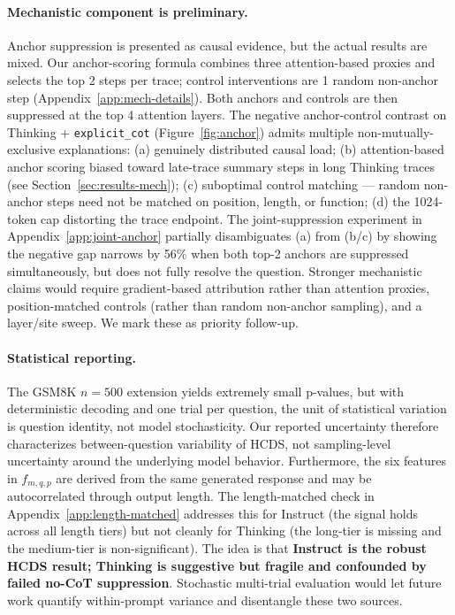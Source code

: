 \documentclass{article}
\theoremstyle{plain}
\theoremstyle{definition}
\theoremstyle{remark}
\begin{document}
\paragraph{Mechanistic component is preliminary.}
Anchor suppression is presented as causal evidence, but the actual results are mixed. Our anchor-scoring formula combines three attention-based proxies and selects the top 2 steps per trace; control interventions are 1 random non-anchor step (Appendix~\ref{app:mech-details}). Both anchors and controls are then suppressed at the top 4 attention layers. The negative anchor-control contrast on Thinking + \texttt{explicit\_cot} (Figure~\ref{fig:anchor}) admits multiple non-mutually-exclusive explanations: (a) genuinely distributed causal load; (b) attention-based anchor scoring biased toward late-trace summary steps in long Thinking traces (see Section~\ref{sec:results-mech}); (c) suboptimal control matching --- random non-anchor steps need not be matched on position, length, or function; (d) the 1024-token cap distorting the trace endpoint. The joint-suppression experiment in Appendix~\ref{app:joint-anchor} partially disambiguates (a) from (b/c) by showing the negative gap narrows by 56\% when both top-2 anchors are suppressed simultaneously, but does not fully resolve the question. Stronger mechanistic claims would require gradient-based attribution rather than attention proxies, position-matched controls (rather than random non-anchor sampling), and a layer/site sweep. We mark these as priority follow-up.

\paragraph{Statistical reporting.}
The GSM8K $n=500$ extension yields extremely small p-values, but with deterministic decoding and one trial per question, the unit of statistical variation is question identity, not model stochasticity. Our reported uncertainty therefore characterizes between-question variability of HCDS, not sampling-level uncertainty around the underlying model behavior. Furthermore, the six features in $f_{m,q,p}$ are derived from the same generated response and may be autocorrelated through output length. The length-matched check in Appendix~\ref{app:length-matched} addresses this for Instruct (the signal holds across all length tiers) but not cleanly for Thinking (the long-tier is missing and the medium-tier is non-significant). The idea is that \textbf{Instruct is the robust HCDS result; Thinking is suggestive but fragile and confounded by failed no-CoT suppression}. Stochastic multi-trial evaluation would let future work quantify within-prompt variance and disentangle these two sources.
\end{document}
